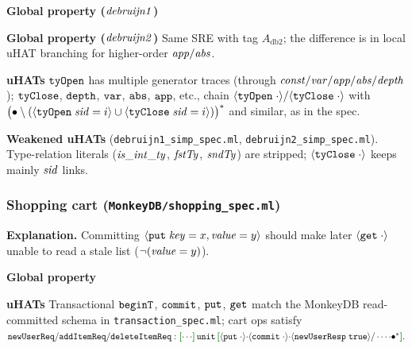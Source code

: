 \textbf{Global property (\(\mathit{debruijn1}\))}
\vspace{-.35cm}\par{}
\vspace{-.4cm}\par\nobreak\noindent
\textbf{Global property (\(\mathit{debruijn2}\))}
Same SRE with tag \(A_{\text{db2}}\); the difference is in local uHAT branching for higher-order \(\mathit{app}/\mathit{abs}\)\@.

\textbf{uHATs}
\(\boldsymbol{{\tt tyOpen}}\) has multiple generator traces (through \(\mathit{const}/\mathit{var}/\mathit{app}/\mathit{abs}/\mathit{depth}\)); \(\boldsymbol{{\tt tyClose}}\), \(\boldsymbol{{\tt depth}}\), \(\boldsymbol{{\tt var}}\), \(\boldsymbol{{\tt abs}}\), \(\boldsymbol{{\tt app}}\), etc., chain \({\langle} {\boldsymbol{{\tt tyOpen}}\;{\cdot}} {\rangle}/{\langle} {\boldsymbol{{\tt tyClose}}\;{\cdot}} {\rangle}\) with \({\bigl(\bullet \setminus ({{\langle} {\boldsymbol{{\tt tyOpen}}\;{\mathit{sid}=i}} {\rangle}} \cup {  {\langle} {\boldsymbol{{\tt tyClose}}\;{\mathit{sid}=i}}  {\rangle} })\bigr)^{\ast}}\) and similar, as in the spec.

\textbf{Weakened uHATs} (\texttt{debruijn1\_simp\_spec.ml}, \texttt{debruijn2\_simp\_spec.ml}).
Type-relation literals (\(\mathit{is\_int\_ty}\), \(\mathit{fstTy}\), \(\mathit{sndTy}\)) are stripped; \({\langle} {\boldsymbol{{\tt tyClose}}\;{\cdot}} {\rangle}\) keeps mainly \(\mathit{sid}\) links.

\subsubsection*{Shopping cart (\texttt{MonkeyDB/shopping\_spec.ml})}
\textbf{Explanation.}
Committing \({\langle} {\boldsymbol{{\tt put}}\;{\mathit{key}=x,\mathit{value}=y}} {\rangle}\) should make later \({\langle} {\boldsymbol{{\tt get}}\;{\cdot}} {\rangle}\) unable to read a stale list (\(\neg(\mathit{value}=y)\)).

\textbf{Global property}
\vspace{-.35cm}\par{}
\vspace{-.4cm}\par\nobreak\noindent
\textbf{uHATs}
Transactional \(\boldsymbol{{\tt beginT}}\), \(\boldsymbol{{\tt commit}}\), \(\boldsymbol{{\tt put}}\), \(\boldsymbol{{\tt get}}\) match the MonkeyDB read-committed schema in \texttt{transaction\_spec.ml}; cart ops satisfy
\(
\eff{newUserReq}/\eff{addItemReq}/\eff{deleteItemReq}:
\effLR{\cdots}\,\Code{unit}\,\effLR{\msgA{put}{\cdot}\seqA\msgA{commit}{\cdot}\seqA\msgA{newUserResp}{\true}/\cdots\seqA\allA}.
\)

